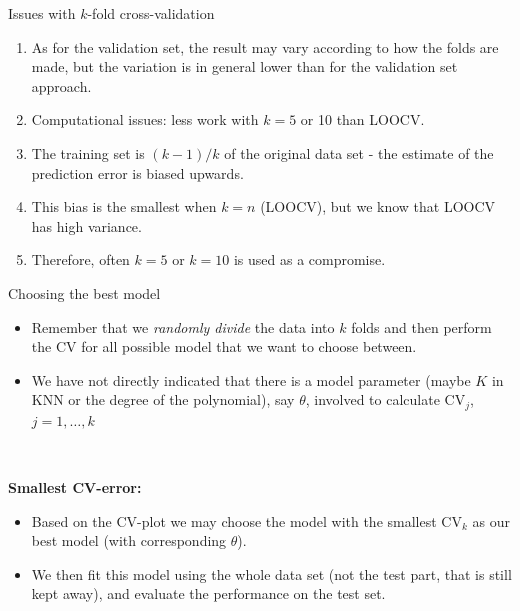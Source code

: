\documentclass[10pt,ignorenonframetext,]{beamer}
\providecommand{\tightlist}{%
  \setlength{\itemsep}{0pt}\setlength{\parskip}{0pt}}
\begin{document}
\begin{frame}

\begin{block}{Issues with \(k\)-fold cross-validation}

\vspace{2mm}

\begin{enumerate}
\def\labelenumi{\arabic{enumi}.}
\item
  As for the validation set, the result may vary according to how the
  folds are made, but the variation is in general lower than for the
  validation set approach.
\item
  Computational issues: less work with \(k=5\) or 10 than LOOCV.
\item
  The training set is \((k-1)/k\) of the original data set - the
  estimate of the prediction error is biased upwards.
\item
  This bias is the smallest when \(k=n\) (LOOCV), but we know that LOOCV
  has high variance.
\item
  Therefore, often \(k=5\) or \(k=10\) is used as a compromise.
\end{enumerate}

\end{block}

\end{frame}

\begin{frame}

\begin{block}{Choosing the best model}

\vspace{2mm}

\begin{itemize}
\item
  Remember that we \emph{randomly divide} the data into \(k\) folds and
  then perform the CV for all possible model that we want to choose
  between.
\item
  We have not directly indicated that there is a model parameter (maybe
  \(K\) in KNN or the degree of the polynomial), say \(\theta\),
  involved to calculate \(\text{CV}_j\), \(j=1,\ldots, k\)
\end{itemize}

\(~\)

\textbf{Smallest CV-error:}

\begin{itemize}
\tightlist
\item
  Based on the CV-plot we may choose the model with the smallest
  \({\text{CV}_k}\) as our best model (with corresponding \(\theta\)).
\item
  We then fit this model using the whole data set (not the test part,
  that is still kept away), and evaluate the performance on the test
  set.
\end{itemize}

\end{block}

\end{frame}
\end{document}
